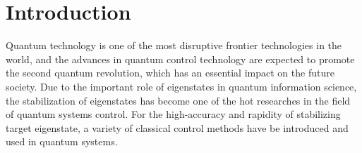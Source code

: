 \documentclass[]{elsarticle}
\begin{document}
\linenumbers

\section{Introduction}\label{Sec:Intro}
Quantum technology is one of the most disruptive frontier technologies in the world, and the advances in quantum control technology are expected to promote the second quantum revolution, which has an essential impact on the future society. Due to the important role of eigenstates in quantum information science, the stabilization of eigenstates has become one of the hot researches in the field of quantum systems control. For the high-accuracy and rapidity of stabilizing target eigenstate, a variety of classical control methods \cite{DDJ2001,JHBJ2009,DPJ2012A,DPJ2012B,MPJ2012,KCJ2008,KDPJ2017} have be introduced and used in quantum systems.
\end{document}
